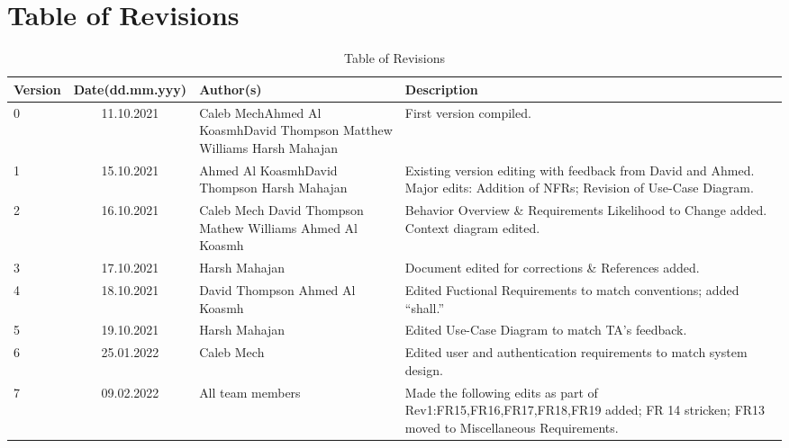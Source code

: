 \documentclass[fullpage]{article}
\begin{document}
\section{Table of Revisions}
\begin{table}[h]
\centering
\begin{tabular}{| l | c | p{4cm}| p{5cm}|}
\hline
 \rowcolor{lightgray} 
\textbf{Version} & \textbf{Date(dd.mm.yyy)} &\textbf{Author(s)} &\textbf{Description}\\
\hline
0 & 11.10.2021 & Caleb Mech\newline Ahmed Al Koasmh\newline  David Thompson \newline Matthew Williams \newline Harsh Mahajan & First version compiled.\\
\hline
1 & 15.10.2021 & Ahmed Al Koasmh\newline David Thompson \newline Harsh Mahajan & Existing version editing with feedback from David and Ahmed. \newline Major edits: Addition of NFRs; Revision of Use-Case Diagram.\\
\hline
2 & 16.10.2021 & Caleb Mech \newline David Thompson \newline Mathew Williams \newline Ahmed Al Koasmh & Behavior Overview \& Requirements Likelihood to Change added. Context diagram edited.\\
\hline
3&17.10.2021& Harsh Mahajan &Document edited for corrections \& References added.\\
\hline
4 & 18.10.2021& David Thompson \newline Ahmed Al Koasmh & Edited Fuctional Requirements to match conventions; added ``shall.''\\
\hline
5 & 19.10.2021 & Harsh Mahajan & Edited Use-Case Diagram to match TA's feedback.\\
\hline
6 & 25.01.2022 & Caleb Mech & Edited user and authentication requirements to match system design.\\
\hline
7 & 09.02.2022 & All team members & Made the following edits as part of Rev1:\newline FR15,FR16,FR17,FR18,FR19 added; \newline FR 14 stricken; \newline FR13 moved to Miscellaneous Requirements.\\
\hline
\end{tabular}
\caption{Table of Revisions}

\end{table}
\newpage
\end{document}
